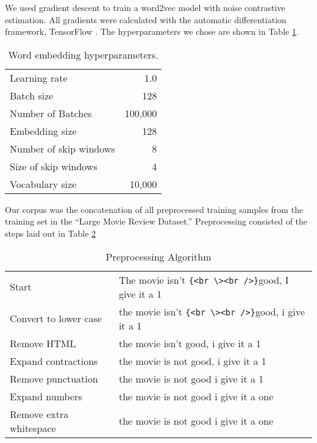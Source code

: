 \label{sec:word_emb_results}
We used gradient descent to train a word2vec model with noise contrastive estimation.  All gradients were calculated with the automatic differentiation framework, TensorFlow \cite{ma16}.  The hyperparameters we chose are shown in Table \ref{tab:embedding_hperparameters}.

\begin{table}[h]
\centering
\begin{tabular}{ l | r }
    \hline
    Learning rate & 1.0 \\
    Batch size & 128 \\
    Number of Batches & 100,000 \\
    Embedding size & 128 \\
    Number of skip windows & 8 \\
    Size of skip windows & 4 \\
    Vocabulary size & 10,000 \\
    \hline
\end{tabular}
\caption{Word embedding hyperparameters.}
\label{tab:embedding_hperparameters}
\end{table}

Our corpus was the concatenation of all preprocessed training samples from the training set in the ``Large Movie Review Dataset.'' \cite{am11}  Preprocessing consisted of the steps laid out in Table \ref{tab:preproc}

\begin{table}[h]
\centering
\begin{tabular}{ l | l }
    \hline
    Start & The movie isn't \verb|{<br \><br />}|good, I give it a 1\\
    Convert to lower case & the movie isn't \verb|{<br \><br />}|good, i give it a 1\\
    Remove HTML & the movie isn't \space good, i give it a 1\\
    Expand contractions & the movie is not \space good, i give it a 1\\
    Remove punctuation & the movie is not \space good i give it a 1\\
    Expand numbers & the movie is not \space good i give it a one\\
    Remove extra whitespace & the movie is not good i give it a one\\
    \hline
\end{tabular}
\caption{Preprocessing Algorithm}
\label{tab:preproc}
\end{table}

